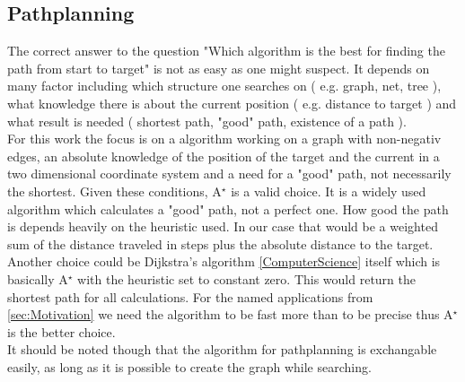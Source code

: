 \subsection{Pathplanning}
The correct answer to the question "Which algorithm is the best for finding the path from start to target" is not as easy as one might suspect. 
It depends on many factor including which structure one searches on ( e.g. graph, net, tree ), what knowledge there is about the current position ( e.g. distance to target ) and what result is needed ( shortest path, "good" path, existence of a path ).\\
For this work the focus is on a algorithm working on a graph with non-negativ edges, an absolute knowledge of the position of the target and the current in a two dimensional coordinate system and a need for a "good" path, not necessarily the shortest. Given these conditions, A$^\star$ is a valid choice. It is a widely used algorithm which calculates a "good" path, not a perfect one. How good the path is depends heavily on the heuristic used. In our case that would be a weighted sum of the distance traveled in steps plus the absolute distance to the target.\\
Another choice could be Dijkstra's algorithm \ref{ComputerScience} itself which is basically A$^\star$ with the heuristic set to constant zero. This would return the shortest path for all calculations. For the named applications from \ref{sec:Motivation} we need the algorithm to be fast more than to be precise thus A$^\star$ is the better choice.\\
It should be noted though that the algorithm for pathplanning is exchangable easily, as long as it is possible to create the graph while searching.

